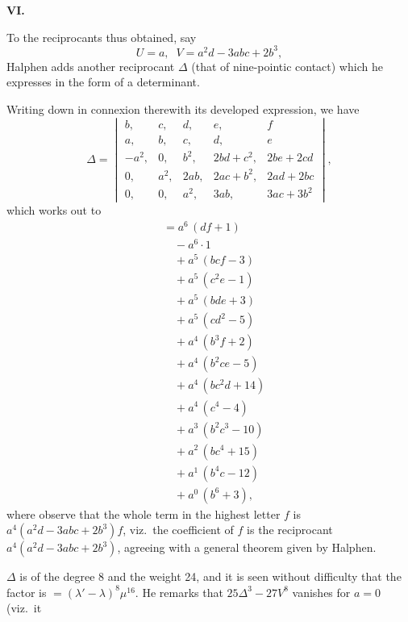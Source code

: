 \documentclass[11pt]{article}
\begin{document}
\medskip
\textbf{VI.}

To the reciprocants thus obtained, say
\[ U = a,\;\; V = a^2d - 3abc + 2b^3, \]
Halphen adds another reciprocant $\Delta$ (that of nine-pointic contact) which he expresses in the form of a determinant.

Writing down in connexion therewith its developed expression, we have
\[ \Delta = \begin{vmatrix} b, & c, & d, & e, & f\\ a, & b, & c, & d, & e\\ -a^2, & 0, & b^2, & 2bd + c^2, & 2be + 2cd\\ 0, & a^2, & 2ab, & 2ac + b^2, & 2ad + 2bc\\ 0, & 0, & a^2, & 3ab, & 3ac + 3b^2 \end{vmatrix}, \]
which works out to
\begin{align*}
&= a^6\,(df + 1)\\
&\quad - a^6 \cdot 1\\
&\quad + a^5\,(bcf - 3)\\
&\quad + a^5\,(c^2e - 1)\\
&\quad + a^5\,(bde + 3)\\
&\quad + a^5\,(cd^2 - 5)\\
&\quad + a^4\,(b^3f + 2)\\
&\quad + a^4\,(b^2ce - 5)\\
&\quad + a^4\,(bc^2d + 14)\\
&\quad + a^4\,(c^4 - 4)\\
&\quad + a^3\,(b^2c^3 - 10)\\
&\quad + a^2\,(bc^4 + 15)\\
&\quad + a^1\,(b^4c - 12)\\
&\quad + a^0\,(b^6 + 3),
\end{align*}
where observe that the whole term in the highest letter $f$ is $a^4(a^2d - 3abc + 2b^3)f$, viz.\ the coefficient of $f$ is the reciprocant $a^4(a^2d - 3abc + 2b^3)$, agreeing with a general theorem given by Halphen.

$\Delta$ is of the degree 8 and the weight 24, and it is seen without difficulty that the factor is $=(\lambda' - \lambda)^8\mu^{16}$. He remarks that $25\Delta^3 - 27V^8$ vanishes for $a = 0$ (viz.\ it
\end{document}

